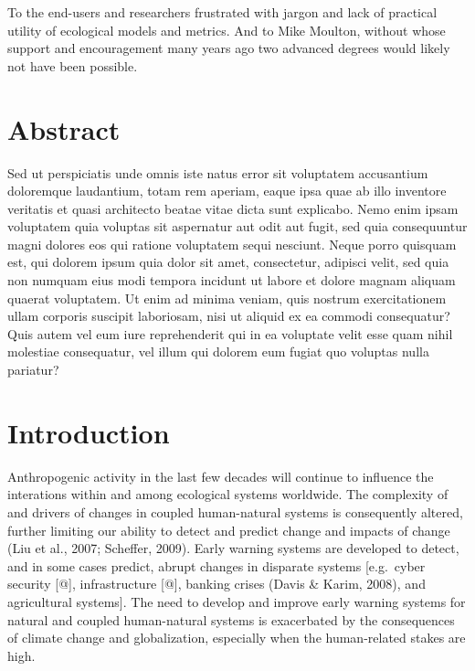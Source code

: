\documentclass[12pt,twoside,openany]{reedthesis}
\begin{document}
  \begin{dedication}
    To the end-users and researchers frustrated with jargon and lack of
    practical utility of ecological models and metrics. And to Mike Moulton,
    without whose support and encouragement many years ago two advanced
    degrees would likely not have been possible.
  \end{dedication}
\mainmatter %
\pagestyle{fancyplain} %

\chapter*{Abstract}\label{abstract}

Sed ut perspiciatis unde omnis iste natus error sit voluptatem
accusantium doloremque laudantium, totam rem aperiam, eaque ipsa quae ab
illo inventore veritatis et quasi architecto beatae vitae dicta sunt
explicabo. Nemo enim ipsam voluptatem quia voluptas sit aspernatur aut
odit aut fugit, sed quia consequuntur magni dolores eos qui ratione
voluptatem sequi nesciunt. Neque porro quisquam est, qui dolorem ipsum
quia dolor sit amet, consectetur, adipisci velit, sed quia non numquam
eius modi tempora incidunt ut labore et dolore magnam aliquam quaerat
voluptatem. Ut enim ad minima veniam, quis nostrum exercitationem ullam
corporis suscipit laboriosam, nisi ut aliquid ex ea commodi consequatur?
Quis autem vel eum iure reprehenderit qui in ea voluptate velit esse
quam nihil molestiae consequatur, vel illum qui dolorem eum fugiat quo
voluptas nulla pariatur?

\chapter{Introduction}\label{intro-chapter}

Anthropogenic activity in the last few decades will continue to
influence the interations within and among ecological systems worldwide.
The complexity of and drivers of changes in coupled human-natural
systems is consequently altered, further limiting our ability to detect
and predict change and impacts of change (Liu et al., 2007; Scheffer,
2009). Early warning systems are developed to detect, and in some cases
predict, abrupt changes in disparate systems {[}e.g.~cyber security
{[}@{]}, infrastructure {[}@{]}, banking crises (Davis \& Karim, 2008),
and agricultural systems{]}. The need to develop and improve early
warning systems for natural and coupled human-natural systems is
exacerbated by the consequences of climate change and globalization,
especially when the human-related stakes are high.
\end{document}
